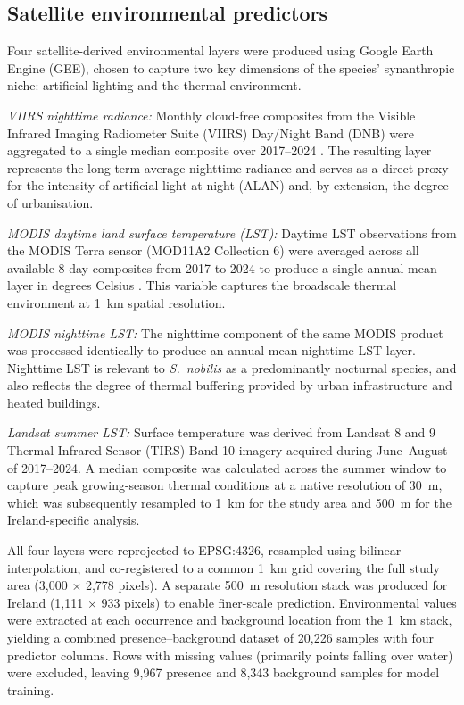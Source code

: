 \documentclass[11pt, a4paper, twocolumn]{article}
\begin{document}
\subsection{Satellite environmental predictors}

Four satellite-derived environmental layers were produced using Google Earth Engine (GEE), 
chosen to capture two key dimensions of the species' synanthropic niche: artificial lighting and the thermal environment.

\textit{VIIRS nighttime radiance:} Monthly cloud-free composites from the Visible Infrared Imaging Radiometer 
Suite (VIIRS) Day/Night Band (DNB) were aggregated to a single median composite over 2017--2024 \citep{Elvidge2017}. 
The resulting layer represents the long-term average nighttime radiance and serves as a direct proxy for the intensity of artificial light at night (ALAN) and, by extension, the degree of urbanisation.

\textit{MODIS daytime land surface temperature (LST):} Daytime LST observations from the MODIS Terra sensor (MOD11A2 Collection 6) were averaged across all available 8-day composites from 2017 to 2024 to produce a single annual mean layer in degrees Celsius \citep{Wan2014}. This variable captures the broadscale thermal environment at 1~km spatial resolution.

\textit{MODIS nighttime LST:} The nighttime component of the same MODIS product was processed identically to produce an annual mean nighttime LST layer. Nighttime LST is relevant to \textit{S.~nobilis} as a predominantly nocturnal species, and also reflects the degree of thermal buffering provided by urban infrastructure and heated buildings.

\textit{Landsat summer LST:} Surface temperature was derived from Landsat 8 and 9 Thermal Infrared Sensor (TIRS) Band 10 imagery acquired during June--August of 2017--2024. A median composite was calculated across the summer window to capture peak growing-season thermal conditions at a native resolution of 30~m, which was subsequently resampled to 1~km for the study area and 500~m for the Ireland-specific analysis.

All four layers were reprojected to EPSG:4326, resampled using bilinear interpolation, and co-registered to a common 1~km grid covering the full study area (3,000 $\times$ 2,778 pixels). A separate 500~m resolution stack was produced for Ireland (1,111 $\times$ 933 pixels) to enable finer-scale prediction. Environmental values were extracted at each occurrence and background location from the 1~km stack, yielding a combined presence--background dataset of 20,226 samples with four predictor columns. Rows with missing values (primarily points falling over water) were excluded, leaving 9,967 presence and 8,343 background samples for model training.
\end{document}
